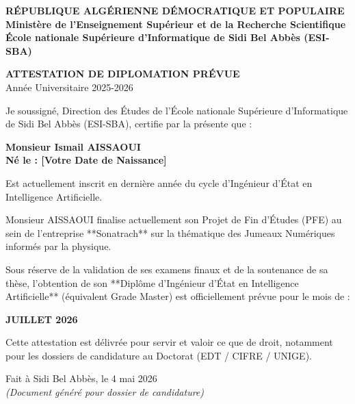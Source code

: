 \documentclass[12pt,a4paper]{article}
\begin{document}
\begin{center}
    \textbf{\Large RÉPUBLIQUE ALGÉRIENNE DÉMOCRATIQUE ET POPULAIRE} \\
    \textbf{Ministère de l'Enseignement Supérieur et de la Recherche Scientifique} \\
    \medskip
    \textbf{École nationale Supérieure d'Informatique de Sidi Bel Abbès (ESI-SBA)}
\end{center}

\bigskip
\bigskip

\begin{center}
    {\Huge \textbf{\color{primary} ATTESTATION DE DIPLOMATION PRÉVUE}} \\
    \medskip
    {\large Année Universitaire 2025-2026}
\end{center}

\bigskip
\bigskip

\noindent Je soussigné, Direction des Études de l'École nationale Supérieure d'Informatique de Sidi Bel Abbès (ESI-SBA), certifie par la présente que :

\bigskip

\begin{center}
    {\Large \textbf{Monsieur Ismail AISSAOUI}} \\
    \textbf{Né le : [Votre Date de Naissance]} \\
\end{center}

\bigskip

\noindent Est actuellement inscrit en dernière année du cycle d'Ingénieur d'État en Intelligence Artificielle.

\bigskip

\noindent Monsieur AISSAOUI finalise actuellement son Projet de Fin d'Études (PFE) au sein de l'entreprise **Sonatrach** sur la thématique des Jumeaux Numériques informés par la physique.

\bigskip

\noindent Sous réserve de la validation de ses examens finaux et de la soutenance de sa thèse, l'obtention de son **Diplôme d'Ingénieur d'État en Intelligence Artificielle** (équivalent Grade Master) est officiellement prévue pour le mois de :

\bigskip

\begin{center}
    {\huge \textbf{JUILLET 2026}}
\end{center}

\bigskip

\noindent Cette attestation est délivrée pour servir et valoir ce que de droit, notamment pour les dossiers de candidature au Doctorat (EDT / CIFRE / UNIGE).

\bigskip
\bigskip

\begin{flushright}
    Fait à Sidi Bel Abbès, le 4 mai 2026 \\
    \bigskip
    \textit{(Document généré pour dossier de candidature)}
\end{flushright}
\end{document}

